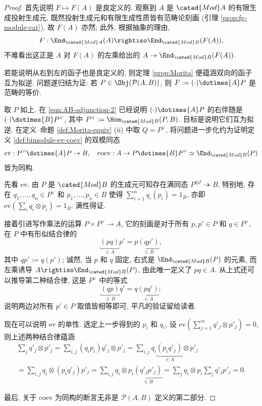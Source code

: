 \begin{proof}
	首先说明 $F \mapsto F(A)$ 是良定义的. 观察到 $A$ 是 $\cated{Mod}A$ 的有限生成投射生成元, 既然投射生成元和有限生成性质皆有范畴论刻画 (引理 \ref{prop:fg-module-cat}), 故 $F(A)$ 亦然; 此外, 根据抽象的理由,
	\[ F: \End_{\cated{Mod}A}(A) \rightiso \End_{\cated{Mod}B}(F(A)), \]
	不难看出这正是 $A$ 对 $F(A)$ 的左乘给出的 $A \to \End_{\cated{Mod}B}(F(A))$.
	
	若能说明从右到左的函子也是良定义的, 则定理 \ref{prop:Morita} 便蕴涵双向的函子互为拟逆. 问题遂归结为证: 若 $P \in \Obj(\mathcal{P}(A, B))$, 则 $F := (\cdot) \dotimes{A} P$ 是范畴的等价.
	
	取 $P$ 如上. 在 \eqref{eqn:AB-adjunction-2} 已经说明 $(\cdot) \dotimes{A} P$ 的右伴随是 $(\cdot) \dotimes{B} P^\vee$, 其中 $P^\vee := \Hom_{\cated{Mod}B}(P, B)$. 目标是说明它们互为拟逆. 在定义--命题 \ref{def:Morita-equiv} (ii) 中取 $Q = P^\vee$, 将问题进一步化约为证明定义 \ref{def:bimodule-ev-coev} 的双模同态
	\[ \mathrm{ev}: P^\vee \dotimes{A} P \to B, \quad \mathrm{coev}: A \to P \dotimes{B} P^\vee \simeq \End_{\cated{Mod}B}(P) \]
	皆为同构.
	
	先看 $\mathrm{ev}$. 由 $P$ 是 $\cated{Mod}B$ 的生成元可知存在满同态 $P^{\oplus I} \twoheadrightarrow B$, 特别地, 存在 $q_1, \ldots, q_n \in P^\vee$ 和 $p_1, \ldots, p_n \in B$ 使得 $\sum_{i=1}^n q_i(p_i) = 1_B$, 亦即 $\mathrm{ev}(\sum_i q_i \otimes p_i) = 1_B$. 满性得证.
	
	接着引进写作乘法的运算 $P \times P^\vee \to A$, 它的刻画是对于所有 $p, p' \in P$ 和 $q \in P^\vee$, 在 $P$ 中有形似结合律的
	\[ \underbracket{(pq)}_{\in A} p' = p \underbracket{(qp')}_{\in B}, \]
	其中 $qp' := q(p')$; 诚然, 当 $p$ 和 $q$ 固定, 右式是 $\End_{\cated{Mod}B}(P)$ 的元素, 而左乘诱导 $A \rightiso \End_{\cated{Mod}B}(P)$, 由此唯一定义了 $pq \in A$. 从上式还可以推导第二种结合律, 这是 $P^\vee$ 中的等式
	\[ \underbracket{(qp)}_{\in B} q' = q \underbracket{(pq')}_{\in A}; \]
	说明两边对所有 $p' \in P$ 取值皆相等即可, 平凡的验证留给读者.

	现在可以说明 $\mathrm{ev}$ 的单性. 选定上一步得到的 $p_i$ 和 $q_i$, 设 $\mathrm{ev}(\sum_{j=1}^m q'_j \otimes p'_j) = 0$, 则上述两种结合律蕴涵
	\begin{multline*}
		\sum_j q'_j \otimes p'_j = \sum_{i, j} (q_i p_i) q'_j \otimes p'_j
		= \sum_{i, j} q_i \underbracket{(p_i q'_j)}_{\in A} \otimes p'_j \\
		= \sum_{i, j} q_i \otimes (p_i q'_j) p'_j
		= \sum_{i, j} q_i \otimes p_i \underbracket{(q'_j p'_j)}_{\in B}
		= \sum_j q_i \otimes p_i \sum_j q'_j p'_j = 0.
	\end{multline*}

	最后, 关于 $\mathrm{coev}$ 为同构的断言无非是 $\mathcal{P}(A, B)$ 定义的第二部分.
\end{proof}
